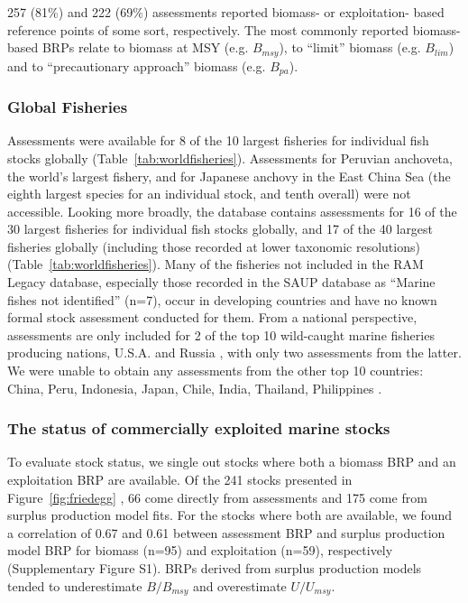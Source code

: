257 (81\%) and
222 (69\%)
assessments reported biomass- or exploitation- based reference points
of some sort, respectively. The most commonly reported biomass-based
BRPs relate to biomass at MSY (e.g. $B_{msy}$), to ``limit'' biomass
(e.g. $B_{lim}$) and to ``precautionary approach'' biomass (e.g.
$B_{pa}$).


\subsubsection*{Global Fisheries}
Assessments were available for 8 of the 10 largest fisheries for
individual fish stocks globally (Table~\ref{tab:worldfisheries}). Assessments for Peruvian
anchoveta, the world's largest fishery, and for Japanese anchovy in
the East China Sea (the eighth largest species for an individual
stock, and tenth overall) were not accessible. Looking more broadly,
the database contains assessments for 16 of the 30 largest fisheries
for individual fish stocks globally, and 17 of the 40 largest
fisheries globally (including those recorded at lower taxonomic
resolutions) (Table~\ref{tab:worldfisheries}). Many of the fisheries not included in the RAM
Legacy database, especially those recorded in the SAUP database as
``Marine fishes not identified'' (n=7), occur in developing countries
and have no known formal stock assessment conducted for them.  From a
national perspective, assessments are only included for 2 of the top
10 wild-caught marine fisheries producing nations, U.S.A. and Russia
\citep{FAO:sofia}, with only two assessments from the latter. We were unable
to obtain any assessments from the other top 10 countries: China,
Peru, Indonesia, Japan, Chile, India, Thailand, Philippines \citep{FAO:sofia}.

\subsubsection*{The status of commercially exploited marine stocks }
To evaluate stock status, we single out stocks where both a biomass
BRP and an exploitation BRP are available. Of the
241 stocks presented in
Figure~\ref{fig:friedegg} , 66 come
directly from assessments and 175 come
from surplus production model fits. For the stocks where both are
available, we found a correlation of 0.67 and
0.61 between assessment BRP and surplus production
model BRP for biomass (n=95) and exploitation (n=59), respectively (Supplementary
Figure S1). BRPs derived from surplus production models tended to
underestimate $B/B_{msy}$ and overestimate $U/U_{msy}$.

